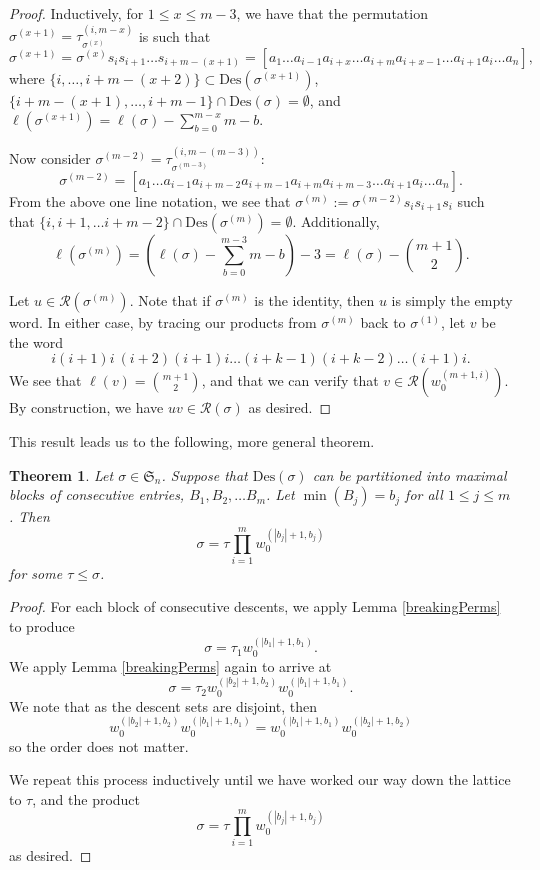 \documentclass[11pt,reqno]{amsart}
\newtheorem{theorem}{Theorem}[section]
\theoremstyle{definition}
\theoremstyle{notation}
\newcommand{\Des}{\text{Des}}
\newcommand{\calR}{\mathcal{R}}
\begin{document}
\begin{proof}
Inductively, for $1\leq x\leq m-3$, we have that the permutation $\sigma^{(x+1)} = \tau_{\sigma^{(x)}}^{(i,m-x)}$ is such that
\[
\sigma^{(x+1)} =  \sigma^{(x)}s_is_{i+1}\ldots s_{i+m-(x+1)}= [a_1\ldots a_{i-1}a_{i+x}\ldots a_{i+m}a_{i+x-1}\ldots a_{i+1}a_i\ldots a_n],
\]
where $\{i,\ldots, i+m-(x+2) \}  \subset \Des(\sigma^{(x+1)} )$, $\{i+m-(x+1), \ldots , i+m-1 \} \cap \Des(\sigma) = \emptyset$, and $\ell(\sigma^{(x+1)} ) = \ell(\sigma) - \sum_{b=0}^{m-x}m-b$. 

Now consider $\sigma^{(m-2)} = \tau_{\sigma^{(m-3)}}^{(i,m-(m-3))}$:
\[
\sigma^{(m-2)} = [a_1\ldots a_{i-1}a_{i+m-2}a_{i+m-1}a_{i+m}a_{i+m-3}\ldots a_{i+1}a_i\ldots a_n].
\]
From the above one line notation, we see that $\sigma^{(m)}:=\sigma^{(m-2)} s_i s_{i+1}s_i$ such that $\{i,i+1,\ldots i+m-2 \} \cap \Des(\sigma^{(m)}) = \emptyset$. Additionally, 
\[
\ell(\sigma^{(m)}) =\left ( \ell(\sigma) - \sum_{b=0}^{m-3}m-b\right ) -3 =  \ell(\sigma) - \binom{m+1}{2}.
\]

Let $u\in \calR(\sigma^{(m)})$. Note that if $\sigma^{(m)}$ is the identity, then $u$ is simply the empty word. In either case, by tracing our products from $\sigma^{(m)}$ back to $\sigma^{(1)}$, let $v$ be the word
\[
i(i+1)i~(i+2)(i+1)i\ldots (i+k-1)(i+k-2)\ldots (i+1)i.
\]
We see that $\ell(v) = \binom{m+1}{2}$, and that we can verify that $v\in \calR(w_0^{(m+1,i)})$. 
By construction, we have $uv\in \calR(\sigma)$ as desired.
\end{proof}

This result leads us to the following, more general theorem.

\begin{theorem}\label{thm:descentsetbreak}
    Let $\sigma\in \mathfrak{S}_n$. Suppose that $\Des(\sigma)$ can be partitioned into maximal blocks of consecutive entries, $B_1, B_2,\ldots B_m$. Let $\min(B_j) = b_j$ for all $1\leq j\leq m$. Then
    \[
    \sigma = \tau \prod_{i=1}^m w_0^{(|b_j|+1,b_j)}
    \]
    for some $\tau \leq \sigma$.
\end{theorem}

\begin{proof}
    For each block of consecutive descents, we apply Lemma \ref{breakingPerms} to produce \[\sigma = \tau_1 w_0^{(|b_1|+1,b_1)}.\]
    We apply  Lemma \ref{breakingPerms} again to arrive at 
    \[
    \sigma = \tau_2 w_0^{(|b_2|+1,b_2)}w_0^{(|b_1|+1,b_1)}.\] 
    We note that as the descent sets are disjoint, then
    \[
    w_0^{(|b_2|+1,b_2)}w_0^{(|b_1|+1,b_1)} = w_0^{(|b_1|+1,b_1)}w_0^{(|b_2|+1,b_2)}
    \]
    so the order does not matter.
    
    We repeat this process inductively until we have worked our way down the lattice to $\tau$, and the product 
     \[
    \sigma = \tau \prod_{i=1}^m w_0^{(|b_j|+1,b_j)}
    \]
    as desired.
\end{proof}
\end{document}
